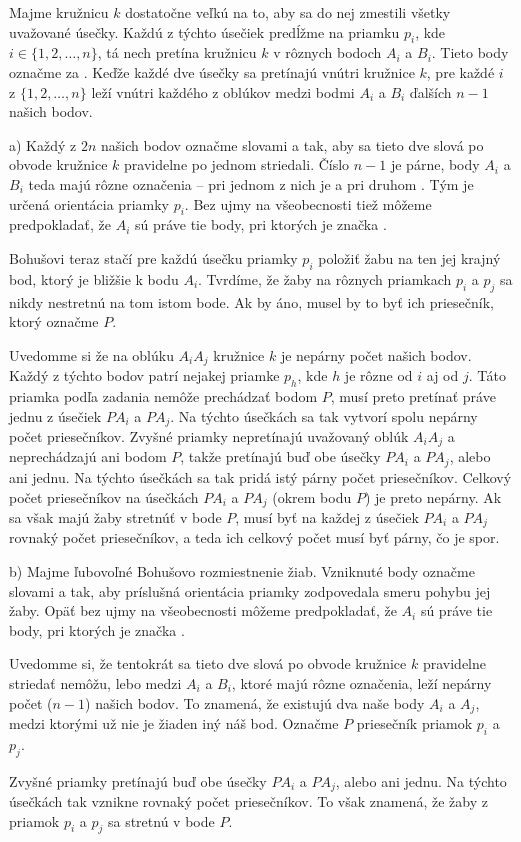 {%
Majme kružnicu $k$ dostatočne veľkú na to,
aby sa do nej zmestili všetky uvažované úsečky.
Každú z týchto úsečiek predĺžme na priamku $p_i$, kde $i\in\{1,2,\dots,n\}$,
tá nech pretína kružnicu $k$ v rôznych bodoch $A_i$ a $B_i$.
Tieto body označme za .
Keďže každé dve úsečky sa pretínajú vnútri kružnice $k$,
pre každé $i$ z $\{1,2,\dots,n\}$ leží vnútri každého z oblúkov medzi bodmi $A_i$ a $B_i$
ďalších $n-1$ našich bodov.

\smallskip
a)
Každý z $2n$ našich bodov označme slovami  a  tak,
aby sa tieto dve slová po obvode kružnice $k$ pravidelne po jednom striedali.
Číslo $n-1$ je párne,
body $A_i$ a $B_i$ teda majú rôzne označenia --
pri jednom z nich je  a pri druhom .
Tým je určená orientácia priamky $p_i$.
Bez ujmy na všeobecnosti tiež môžeme predpokladať,
že $A_i$ sú práve tie body, pri ktorých je značka .

Bohušovi teraz stačí pre každú úsečku priamky $p_i$ položiť žabu na ten jej krajný bod,
ktorý je bližšie k bodu $A_i$.
Tvrdíme, že žaby na rôznych priamkach $p_i$ a $p_j$ sa nikdy nestretnú na tom istom bode.
Ak by áno, musel by to byť ich priesečník, ktorý označme $P$.
%

Uvedomme si že na oblúku $A_iA_j$ kružnice $k$ je nepárny počet našich bodov.
Každý z týchto bodov patrí nejakej priamke $p_h$, kde $h$ je rôzne od $i$ aj od $j$.
Táto priamka podľa zadania nemôže prechádzať bodom $P$,
musí preto pretínať práve jednu z úsečiek $PA_i$ a $PA_j$.
Na týchto úsečkách sa tak vytvorí spolu nepárny počet priesečníkov.
Zvyšné priamky nepretínajú uvažovaný oblúk $A_iA_j$ a neprechádzajú ani bodom $P$,
takže pretínajú buď obe úsečky $PA_i$ a $PA_j$, alebo ani jednu.
Na týchto úsečkách sa tak pridá istý párny počet priesečníkov.
Celkový počet priesečníkov na úsečkách $PA_i$ a $PA_j$ (okrem bodu $P$) je preto nepárny.
Ak sa však majú žaby stretnúť v bode $P$,
musí byť na každej z úsečiek $PA_i$ a $PA_j$ rovnaký počet priesečníkov,
a teda ich celkový počet musí byť párny, čo je spor.

\smallskip
b)
Majme ľubovoľné Bohušovo rozmiestnenie žiab.
Vzniknuté  body označme slovami  a  tak,
aby príslušná orientácia priamky zodpovedala smeru pohybu jej žaby.
Opäť bez ujmy na všeobecnosti môžeme predpokladať,
že $A_i$ sú práve tie body, pri ktorých je značka .

Uvedomme si, že tentokrát sa tieto dve slová po obvode kružnice $k$ pravidelne striedať nemôžu,
lebo medzi $A_i$ a $B_i$, ktoré majú rôzne označenia,
leží nepárny počet ($n-1$) našich bodov.
To znamená, že existujú dva naše body $A_i$ a $A_j$,
medzi ktorými už nie je žiaden iný náš bod.
Označme $P$ priesečník priamok $p_i$ a $p_j$.
%

Zvyšné priamky pretínajú buď obe úsečky $PA_i$ a $PA_j$, alebo ani jednu.
Na týchto úsečkách tak vznikne rovnaký počet priesečníkov.
To však znamená, že žaby z priamok $p_i$ a $p_j$ sa stretnú v bode $P$.
}

